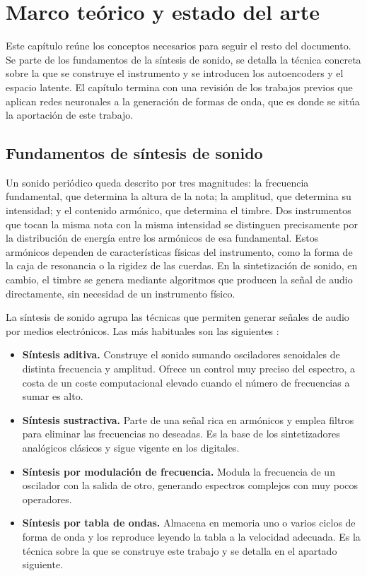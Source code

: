 \chapter{Marco teórico y estado del arte}

Este capítulo reúne los conceptos necesarios para seguir el resto del documento.
Se parte de los fundamentos de la síntesis de sonido, se detalla la técnica
concreta sobre la que se construye el instrumento y se introducen los
autoencoders y el espacio latente. El capítulo termina con una
revisión de los trabajos previos que aplican redes neuronales a la generación de
formas de onda, que es donde se sitúa la aportación de este trabajo.

\section{Fundamentos de síntesis de sonido}

Un sonido periódico queda descrito por tres magnitudes: la frecuencia
fundamental, que determina la altura de la nota; la amplitud, que determina su
intensidad; y el contenido armónico, que determina el timbre. Dos instrumentos
que tocan la misma nota con la misma intensidad se distinguen precisamente por
la distribución de energía entre los armónicos de esa fundamental. Estos armónicos
dependen de características físicas del instrumento, como la forma de la caja de resonancia
o la rigidez de las cuerdas. En la sintetización de sonido, en cambio, el timbre 
se genera mediante algoritmos que producen la señal de audio directamente, sin 
necesidad de un instrumento físico. 

La síntesis de sonido agrupa las técnicas que permiten generar señales de audio
por medios electrónicos. Las más habituales son las siguientes
\cite{Wilson2013}:

\begin{itemize}
    \item \textbf{Síntesis aditiva.} Construye el sonido sumando osciladores
          senoidales de distinta frecuencia y amplitud. Ofrece un control muy
          preciso del espectro, a costa de un coste computacional elevado
          cuando el número de frecuencias a sumar es alto.
    \item \textbf{Síntesis sustractiva.} Parte de una señal rica en armónicos y
          emplea filtros para eliminar las frecuencias no deseadas. Es la base
          de los sintetizadores analógicos clásicos y sigue vigente en los
          digitales.
    \item \textbf{Síntesis por modulación de frecuencia.} Modula la frecuencia
          de un oscilador con la salida de otro, generando espectros complejos
          con muy pocos operadores.
    \item \textbf{Síntesis por tabla de ondas.} Almacena en memoria uno o varios
          ciclos de forma de onda y los reproduce leyendo la tabla a la
          velocidad adecuada. Es la técnica sobre la que se construye este
          trabajo y se detalla en el apartado siguiente.
\end{itemize}

